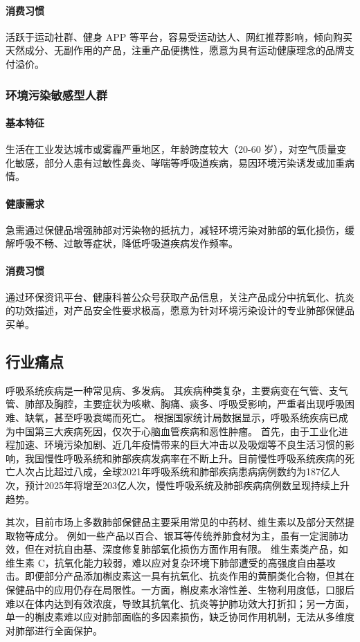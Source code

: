 \documentclass[12pt]{ctexart}
\begin{document}
\paragraph{消费习惯}
活跃于运动社群、健身 APP 等平台，容易受运动达人、网红推荐影响，倾向购买天然成分、无副作用的产品，注重产品便携性，愿意为具有运动健康理念的品牌支付溢价。
\subsubsection{环境污染敏感型人群}
\paragraph{基本特征}
生活在工业发达城市或雾霾严重地区，年龄跨度较大（20-60 岁），对空气质量变化敏感，部分人患有过敏性鼻炎、哮喘等呼吸道疾病，易因环境污染诱发或加重病情。
\paragraph{健康需求}
急需通过保健品增强肺部对污染物的抵抗力，减轻环境污染对肺部的氧化损伤，缓解呼吸不畅、过敏等症状，降低呼吸道疾病发作频率。
\paragraph{消费习惯}
通过环保资讯平台、健康科普公众号获取产品信息，关注产品成分中抗氧化、抗炎的功效描述，对产品安全性要求极高，愿意为针对环境污染设计的专业肺部保健品买单。


\subsection{行业痛点}
\fullboxbegin
呼吸系统疾病是一种常见病、多发病。
其疾病种类复杂，主要病变在气管、支气管、肺部及胸腔，主要症状为咳嗽、胸痛、痰多、呼吸受影响，严重者出现呼吸困难、缺氧，甚至呼吸衰竭而死亡。
根据国家统计局数据显示，呼吸系统疾病已成为中国第三大疾病死因，仅次于心脑血管疾病和恶性肿瘤。
\fullboxend
首先，由于工业化进程加速、环境污染加剧、近几年疫情带来的巨大冲击以及吸烟等不良生活习惯的影响，我国慢性呼吸系统和肺部疾病发病率在不断上升。目前慢性呼吸系统疾病的死亡人次占比超过八成，全球2021年呼吸系统和肺部疾病患病病例数约为187亿人次，预计2025年将增至203亿人次，慢性呼吸系统及肺部疾病病例数呈现持续上升趋势。

其次，目前市场上多数肺部保健品主要采用常见的中药材、维生素以及部分天然提取物等成分。
例如一些产品以百合、银耳等传统养肺食材为主，虽有一定润肺功效，但在对抗自由基、深度修复肺部氧化损伤方面作用有限。
维生素类产品，如维生素 C，抗氧化能力较弱，难以应对复杂环境下肺部遭受的高强度自由基攻击。即便部分产品添加槲皮素这一具有抗氧化、抗炎作用的黄酮类化合物，但其在保健品中的应用仍存在局限性。一方面，槲皮素水溶性差、生物利用度低，口服后难以在体内达到有效浓度，导致其抗氧化、抗炎等护肺功效大打折扣；另一方面，单一的槲皮素难以应对肺部面临的多因素损伤，缺乏协同作用机制，无法从多维度对肺部进行全面保护。
\end{document}
